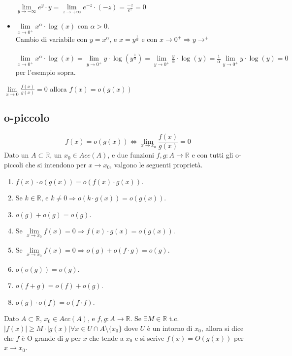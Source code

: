 \begin{itemize}
	$\lim\limits_{y\to -\infty}e^y \cdot y = \lim\limits_{z\to +\infty}e^{-z} \cdot (-z) = \frac{-z}{e^z} = 0$
	\item $\lim\limits_{x\to 0^+}x^\alpha \cdot \log(x)$ con $\alpha > 0$.\\
	Cambio di variabile con $y = x^\alpha$, e $x = y^{\frac{1}{\alpha}}$ e con $x\to 0^+ \Longrightarrow y\to^+$\\\\
	$\lim\limits_{x\to 0^+}x^\alpha \cdot \log(x) = \lim\limits_{y\to 0^+}y \cdot \log(y^{\frac{1}{\alpha}}) = \lim\limits_{y\to 0^+}\frac{y}{\alpha} \cdot \log(y) = \frac{1}{\alpha}\lim\limits_{y\to 0^+} y \cdot \log(y) = 0$ per l'esempio sopra.
\end{itemize}

\begin{center}
	\vspace{-8pt}
	$\lim\limits_{x\to 0}\frac{f(x)}{g(x)} = 0$ allora $f(x) = o(g(x))$
\end{center}

\subsection{o-piccolo}
\begin{equation}
	f(x) = o(g(x)) \Leftrightarrow \lim_{x \rightarrow x_0} \frac{f(x)}{g(x)} = 0
\end{equation}
Dato un $A \subset \mathbb{R}$, un $x_0 \in Acc(A)$, e due funzioni $f,g: A \to \mathbb{R}$ e con tutti gli o-piccoli che si intendono per $x\to x_0$, valgono le seguenti proprietà.
\begin{enumerate}
	\item $f(x) \cdot o(g(x)) = o(f(x) \cdot g(x))$.
	\item Se $k \in \mathbb{R}$, e $k \neq 0 \Longrightarrow o(k \cdot g(x)) = o(g(x))$.
	\item $o(g) + o(g) = o(g)$. 
	\item Se $\lim\limits_{x\to x_0}f(x) = 0 \Longrightarrow f(x) \cdot g(x) = o(g(x))$.
	\item Se $\lim\limits_{x\to x_0}f(x) = 0 \Longrightarrow o(g) + o(f \cdot g) = o(g)$.
	\item $o(o(g)) = o(g)$.
	\item $o(f + g) = o(f) + o(g)$.
	\item $o(g) \cdot o(f) = o(f \cdot f)$.
\end{enumerate}

\begin{definition}[O-grande]
	Dato $A \subset \mathbb{R}$, $x_0 \in Acc(A)$, e $f,g: A \to \mathbb{R}$. Se $\exists M \in \mathbb{R}$ t.c. $|f(x)| \geq M \cdot |g(x)|    \forall x \in U \cap A \setminus \{x_0\}$ dove $U$ è un intorno di $x_0$, allora si dice che $f$ è O-grande di $g$ per $x$ che tende a $x_0$ e si scrive $f(x) = O(g(x))$ per $x\to x_0$.
\end{definition}

